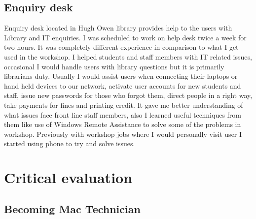 \documentclass[10pt,a4paper,headinclude=true]{report}
\begin{document}
\section{Enquiry desk}
Enquiry desk located in Hugh Owen library provides help to the users with Library and IT enquiries. I was scheduled to work on help desk twice a week for two hours. It was completely different experience in comparison to what I get used in the workshop. I helped students and staff members with IT related issues, occasional I would handle users with library  questions but it is primarily librarians duty. Usually I would assist users when connecting their laptops or hand held devices to our network, activate user accounts for new students and staff, issue new passwords for those who forgot them, direct people in a right way, take payments for fines and printing credit. It gave me better understanding of what issues face front line staff members, also I learned useful techniques from them like use of Windows Remote Assistance to solve some of the problems in workshop. Previously with workshop jobs where I would personally visit user I started using phone to try and solve issues.   

\chapter{Critical evaluation}
\section{Becoming Mac Technician}


\end{document}
